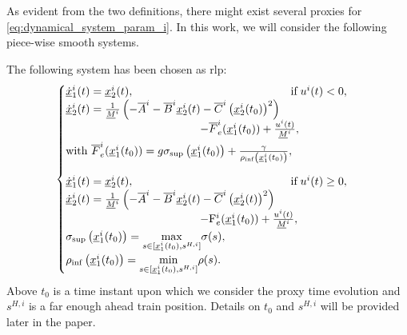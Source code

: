 \documentclass[letterpaper, 10 pt, conference]{ieeeconf}
\theoremstyle{definition}
\theoremstyle{nopoint}
\begin{document}
As evident from the two definitions, there might exist several proxies for  \eqref{eq:dynamical_system_param_i}. In this work, we will consider the following piece-wise smooth systems.


The following system has been chosen as \gls{rlp}:
\begin{equation}\label{eq:rlp_train}
\begin{cases}
\underline{\dot{x}}_1^i(t) =   \underline{x}_2^i(t), \qquad  \qquad \qquad \qquad \qquad \qquad  \qquad  \text{if} \; u^i(t) < 0,  \\
    \underline{\dot{x}}_2^i(t) =  \frac{1}{\underline{M}^i} \left(-\overline{A}^i - \overline{B}^i \underline{x}^i_2(t) -  \overline{C}^i \left(\underline{x}^i_2(t_0)\right)^2 \right) \\ 
    \qquad \qquad \qquad  \qquad \qquad \qquad  -\overline{F}_e^i(\underline{x}^i_1(t_0)) + \frac{u^i(t)}{\underline{M}^i}, \\ \noalign{\vskip3pt}
     \textrm{with } \overline{F}_e^i(\underline{x}^i_1(t_0)) =  g \sigma_{\sup}\left(\underline{x}^i_1(t_0)\right)+ \frac{\gamma}{\rho_{\inf}\left(\underline{x}^i_1(t_0)\right)}, \\
    \noalign{\vskip9pt}
        \underline{\dot{x}}_1^i(t) =   \underline{x}_2^i(t), \qquad \qquad \qquad  \qquad \qquad \qquad \qquad \text{if} \; u^i(t) \geq 0,  \\
    \underline{\dot{x}}_2^i(t) =  \frac{1}{\underline{M}^i} \left(-\overline{A}^i - \overline{B}^i \underline{x}^i_2(t) -  \overline{C}^i \left(\underline{x}^i_2(t)\right)^2 \right) \\ 
    \qquad \qquad \qquad  \qquad \qquad \qquad-\mathrm{F}_e^i(\underline{x}^i_1(t_0))  + \frac{u^i(t)}{\underline{M}^i}, \\
    \sigma_{\sup}\left(\underline{x}^i_1(t_0)\right) = \underset{s \in [\underline{x}_1^i(t_0),s^{H,i}]}{\max} \sigma(s), \\
    \rho_{\inf}\left(\underline{x}^i_1(t_0)\right) = \underset{s \in [\underline{x}_1^i(t_0),s^{H,i}]}{\min} \rho(s).
\end{cases}
\end{equation}
Above $t_0$ is a time instant upon which we consider the proxy time evolution and $s^{H,i}$ is a far enough ahead train  position. Details on $t_0$ and $s^{H,i}$ will be provided later in the paper. 
\end{document}
